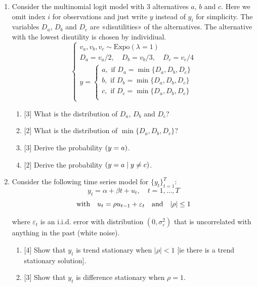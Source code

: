 \documentclass[12pt]{article}
\newcommand{\dExpo}{\mathrm{Expo}} %
\let\P\relax
\DeclareMathOperator{\P}{\mathbb{P}}
\DeclarePairedDelimiter{\abs}{\lvert}{\rvert}
\begin{document}
\begin{enumerate}
    \item Consider the multinomial logit model with 3 alternatives $a$, $b$ and $c$. 
    Here we omit index $i$ for observations and just write $y$ instead of $y_i$ for simplicity. 
    The variables $D_a$, $D_b$ and $D_c$ are «disutilities» of the alternatives. 
    The alternative with the lowest disutility is chosen by individiual.
\[
\begin{cases}
v_a, v_b, v_c \sim \dExpo(\lambda=1) \\
D_{a} = v_{a} / 2, \quad D_{b} = v_{b} / 3, \quad D_{c} = v_{c} / 4 \\ 
y = \begin{cases}
a, \text{ if } D_{a} = \min\{D_{a}, D_{b}, D_{c}\} \\
b, \text{ if } D_{b} = \min\{D_{a}, D_{b}, D_{c}\} \\
c, \text{ if } D_{c} = \min\{D_{a}, D_{b}, D_{c}\} \\
\end{cases}
\end{cases}
\]

\begin{enumerate}
    \item {[3]} What is the distribution of $D_a$, $D_b$ and $D_c$?
    \item {[2]} What is the distribution of $\min\{ D_a, D_b, D_c \}$?
    \item {[3]} Derive the probability $\P(y = a)$.
    \item {[2]} Derive the probability $\P(y = a \mid y \neq c)$.
\end{enumerate}



\newpage



\item Consider the following time series model for \( \{y_t\}_{t=1}^T \):
\[
y_t = \alpha + \beta t + u_t, \quad t = 1, \ldots, T
\]
\[
\text{with} \quad u_t = \rho u_{t-1} + \varepsilon_t \quad \text{and} \quad \abs{\rho} \leq 1
\]

where \( \varepsilon_t \) is an i.i.d. error with distribution \( (0, \sigma_\varepsilon^2) \) that is uncorrelated with anything in the past (white noise).

\begin{enumerate}
    \item {[4]} Show that \( y_t \) is trend stationary when \( |\rho| < 1 \) [ie there is a trend stationary solution].

    \item {[3]} Show that \( y_t \) is difference stationary when \( \rho = 1 \).


\end{enumerate}
\end{enumerate}
\end{document}
